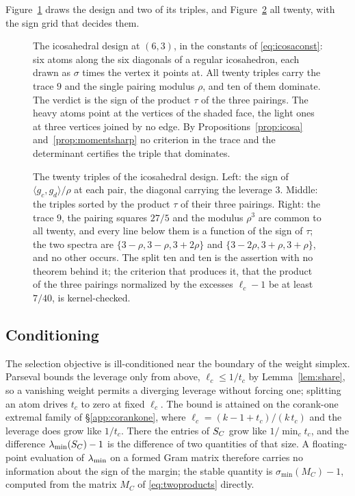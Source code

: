 Figure~\ref{fig:icosa} draws the design and two of its triples, and
Figure~\ref{fig:icosaspec} all twenty, with the sign grid that decides them.

\begin{figure}[ht]
  \centering
  
  \caption{The icosahedral design at $(6,3)$, in the constants of
  \eqref{eq:icosaconst}: six atoms along the six diagonals of a regular
  icosahedron, each drawn as $\sigma$ times the vertex it points at.  All
  twenty triples carry the trace $9$ and the single pairing modulus
  $\rho$, and ten of them dominate.  The verdict is the sign of the
  product $\tau$ of the three pairings.  The heavy atoms point at the
  vertices of the shaded face, the light ones at three vertices joined by
  no edge.  By Propositions~\ref{prop:icosa} and~\ref{prop:momentsharp} no
  criterion in the trace and the determinant certifies the triple that
  dominates.}
  \label{fig:icosa}
\end{figure}

\begin{figure}[ht]
  \centering
  
  \caption{The twenty triples of the icosahedral design.  Left: the sign of
  $\langle g_c,g_d\rangle/\rho$ at each pair, the diagonal carrying the
  leverage $3$.  Middle: the triples sorted by the product $\tau$ of their
  three pairings.  Right: the trace $9$, the pairing squares $27/5$ and the
  modulus $\rho^3$ are common to all twenty, and every line below them is a
  function of the sign of $\tau$; the two spectra are
  $\{3-\rho,3-\rho,3+2\rho\}$ and $\{3-2\rho,3+\rho,3+\rho\}$, and no other
  occurs.  The split ten and ten is the assertion with no theorem behind it;
  the criterion that produces it, that the product of the three pairings
  normalized by the excesses $\ell_c-1$ be at least $7/40$, is
  kernel-checked.}
  \label{fig:icosaspec}
\end{figure}

\subsection{Conditioning}\label{app:hygiene}

\begin{remark}\label{rem:hygiene}
The selection objective is ill-conditioned near the boundary of the weight
simplex.  Parseval bounds the leverage only from above,
$\ell_c\le1/t_c$ by Lemma~\ref{lem:share}, so a vanishing weight permits a
diverging leverage without forcing one; splitting an atom drives $t_c$ to
zero at fixed $\ell_c$.  The bound is attained on the corank-one extremal
family of \S\ref{app:corankone}, where $\ell_c=(k-1+t_c)/(k\,t_c)$ and the
leverage does grow like $1/t_c$.  There the entries of $S_{C}$ grow like
$1/\min_ct_c$, and the difference $\lambda_{\min}(S_{C})-1$ is the difference of two
quantities of that size.  A floating-point evaluation of
$\lambda_{\min}$ on a formed Gram matrix therefore carries no information about the sign
of the margin; the stable quantity is $\sigma_{\min}(M_C)-1$, computed from the
matrix $M_C$ of \eqref{eq:twoproducts} directly.
\end{remark}
